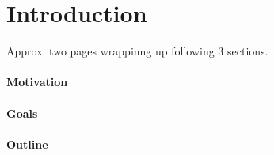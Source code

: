 \chapter{Introduction}

Approx. two pages wrappinng up following 3 sections.

\subsubsection{Motivation}

\subsubsection{Goals}

\subsubsection{Outline}
